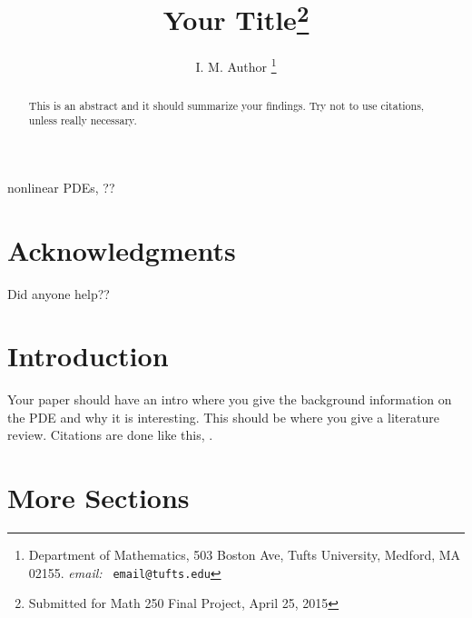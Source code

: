 \documentclass[final]{siamltex}
\title{Your Title\thanks{Submitted for Math 250 Final Project, April 25, 2015}}
\author{I. M. Author
\thanks{Department of Mathematics, 503 Boston Ave, Tufts University,
Medford, MA 02155. {\it email:} {\tt
email@tufts.edu}  } }
\begin{document}
\maketitle

\begin{abstract}
This is an abstract and it should summarize your findings.  Try not to use citations, unless really necessary.   \end{abstract}

\begin{keywords}
nonlinear PDEs, ??
\end{keywords}

\section*{Acknowledgments}
Did anyone help??

\pagestyle{myheadings}
\thispagestyle{plain}

\section{Introduction} Your paper should have an intro where you give the background information on the PDE and why it is interesting.  This should be where you give
a literature review.  Citations are done like this, \cite{1986BrandtA-aa,2001TrottenbergU_OosterleeC_SchullerA-aa}.

\section{More Sections}
\end{document}
